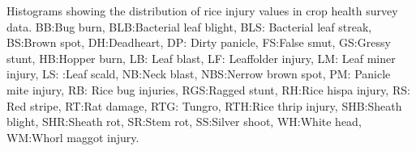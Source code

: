 Histograms showing the distribution of rice injury values in crop health survey data. BB:Bug burn, BLB:Bacterial leaf blight, BLS: Bacterial leaf streak, BS:Brown spot, DH:Deadheart, DP: Dirty panicle, FS:False smut, GS:Gressy stunt, HB:Hopper burn, LB: Leaf blast, LF: Leaffolder injury, LM: Leaf miner injury, LS: :Leaf scald, NB:Neck blast, NBS:Nerrow brown spot, PM: Panicle mite injury, RB: Rice bug injuries, RGS:Ragged stunt, RH:Rice hispa injury, RS: Red stripe, RT:Rat damage, RTG: Tungro, RTH:Rice thrip injury, SHB:Sheath blight, SHR:Sheath rot, SR:Stem rot, SS:Silver shoot, WH:White head, WM:Whorl maggot injury.
